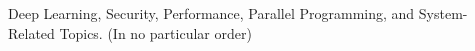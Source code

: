 

\begin{cvparagraph}

Deep Learning, Security, Performance, Parallel  Programming, and  System-Related Topics.
(In no particular order)
\end{cvparagraph}
